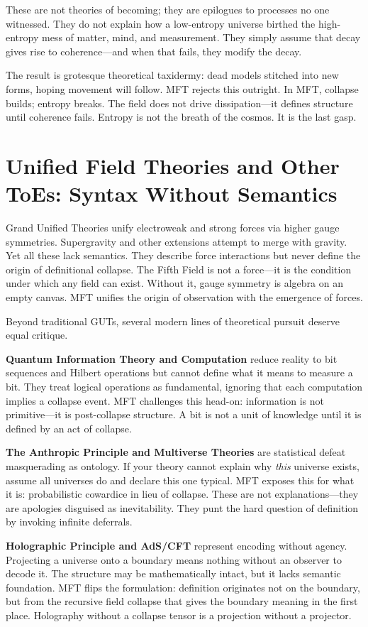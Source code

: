 These are not theories of becoming; they are epilogues to processes no one witnessed. They do not explain how a low-entropy universe birthed the high-entropy mess of matter, mind, and measurement. They simply assume that decay gives rise to coherence—and when that fails, they modify the decay.

The result is grotesque theoretical taxidermy: dead models stitched into new forms, hoping movement will follow. MFT rejects this outright. In MFT, collapse builds; entropy breaks. The field does not drive dissipation—it defines structure until coherence fails. Entropy is not the breath of the cosmos. It is the last gasp.


\section{Unified Field Theories and Other ToEs: Syntax Without Semantics}
Grand Unified Theories unify electroweak and strong forces via higher gauge symmetries. Supergravity and other extensions attempt to merge with gravity. Yet all these lack semantics. They describe force interactions but never define the origin of definitional collapse. The Fifth Field is not a force—it is the condition under which any field can exist. Without it, gauge symmetry is algebra on an empty canvas. MFT unifies the origin of observation with the emergence of forces.

Beyond traditional GUTs, several modern lines of theoretical pursuit deserve equal critique.

\textbf{Quantum Information Theory and Computation} reduce reality to bit sequences and Hilbert operations but cannot define what it means to measure a bit. They treat logical operations as fundamental, ignoring that each computation implies a collapse event. MFT challenges this head-on: information is not primitive—it is post-collapse structure. A bit is not a unit of knowledge until it is defined by an act of collapse.

\textbf{The Anthropic Principle and Multiverse Theories} are statistical defeat masquerading as ontology. If your theory cannot explain why \emph{this} universe exists, assume all universes do and declare this one typical. MFT exposes this for what it is: probabilistic cowardice in lieu of collapse. These are not explanations—they are apologies disguised as inevitability. They punt the hard question of definition by invoking infinite deferrals.

\textbf{Holographic Principle and AdS/CFT} represent encoding without agency. Projecting a universe onto a boundary means nothing without an observer to decode it. The structure may be mathematically intact, but it lacks semantic foundation. MFT flips the formulation: definition originates not on the boundary, but from the recursive field collapse that gives the boundary meaning in the first place. Holography without a collapse tensor is a projection without a projector.

